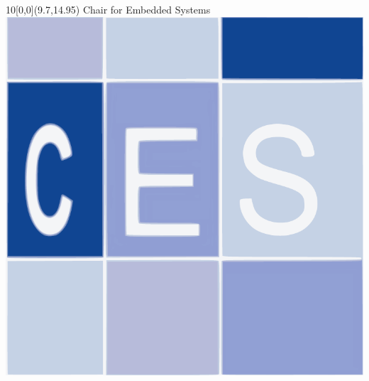 \begin{titlepage}
{{\begin{tabular}[ht]{l c l}
\end{tabular}
}

}

\begin{textblock}{10}[0,0](9.7,14.95)
Chair for Embedded Systems
 \includegraphics[width=.07\textwidth]{CESlogo.pdf}
\end{textblock}


\end{titlepage} 
